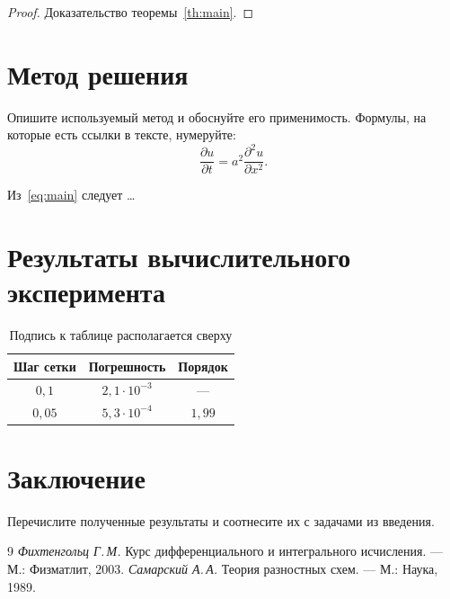 \documentclass[14pt, a4paper]{extarticle}
\theoremstyle{plain}
\theoremstyle{definition}
\begin{document}
\begin{proof}
  Доказательство теоремы~\ref{th:main}.
\end{proof}

\section{Метод решения}

Опишите используемый метод и обоснуйте его применимость. Формулы, на которые
есть ссылки в тексте, нумеруйте:
\begin{equation}\label{eq:main}
  \frac{\partial u}{\partial t} = a^2 \frac{\partial^2 u}{\partial x^2}.
\end{equation}

Из~\eqref{eq:main} следует \ldots

\section{Результаты вычислительного эксперимента}


\begin{table}[h]
  \centering
  \caption{Подпись к таблице располагается сверху}
  \begin{tabular}{|c|c|c|}
    \hline
    Шаг сетки & Погрешность & Порядок \\
    \hline
    $0{,}1$   & $2{,}1\cdot10^{-3}$ & --- \\
    $0{,}05$  & $5{,}3\cdot10^{-4}$ & $1{,}99$ \\
    \hline
  \end{tabular}
\end{table}

\section{Заключение}

Перечислите полученные результаты и соотнесите их с задачами из введения.

\begin{thebibliography}{9}
    \emph{Фихтенгольц Г.\,М.} Курс дифференциального и интегрального
    исчисления. --- М.: Физматлит, 2003.
    \emph{Самарский А.\,А.} Теория разностных схем. --- М.: Наука, 1989.
\end{thebibliography}
\end{document}
